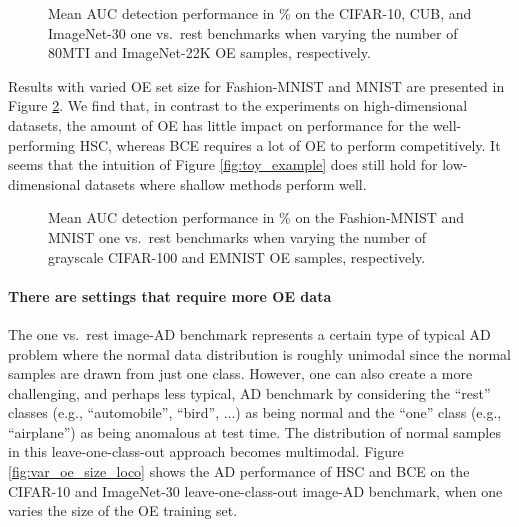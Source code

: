 \documentclass[10pt]{article} \usepackage[accepted]{stylefiles/tmlr}
\begin{document}
\begin{figure}[hbt] \begin{center} 
      \caption{Mean AUC detection performance in \% on the CIFAR-10, CUB, and ImageNet-30 one vs.~rest benchmarks when varying the number of 80MTI and ImageNet-22K OE samples, respectively.}
      \label{fig:var_oe_size}
  \end{center}
\end{figure}


Results with varied OE set size for Fashion-MNIST and MNIST are presented in Figure \ref{fig:var_oe_size_mnist}. 
We find that, in contrast to the experiments on high-dimensional datasets, the amount of OE has little impact on performance for the well-performing HSC, whereas BCE requires a lot of OE to perform competitively.
It seems that the intuition of Figure \ref{fig:toy_example} does still hold for low-dimensional datasets where shallow methods perform well.

\begin{figure}[hbt] \begin{center} 
      \caption{Mean AUC detection performance in \% on the Fashion-MNIST and MNIST one vs.~rest benchmarks when varying the number of grayscale CIFAR-100 and EMNIST OE samples, respectively.}
      \label{fig:var_oe_size_mnist}
  \end{center}
\end{figure}


\paragraph{There are settings that require more OE data}
The one vs.~rest image-AD benchmark represents a certain type of typical AD problem where the normal data distribution is roughly unimodal since the normal samples are drawn from just one class. 
However, one can also create a more challenging, and perhaps less typical, AD benchmark by considering the ``rest'' classes (e.g., ``automobile'', ``bird'', ...) as being normal and the ``one'' class (e.g., ``airplane'') as being anomalous at test time.  
The distribution of normal samples in this leave-one-class-out approach becomes multimodal. 
Figure \ref{fig:var_oe_size_loco} shows the AD performance of HSC and BCE on the CIFAR-10 and ImageNet-30 leave-one-class-out image-AD benchmark, when one varies the size of the OE training set. 
\end{document}
